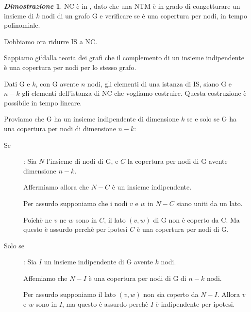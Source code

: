 \documentclass[12pt]{article}
\theoremstyle{definition}
\newtheorem*{myproof}{\em Dimostrazione}
\begin{document}
\begin{myproof}
  NC \`e in \NP, dato che una NTM \`e in grado di congetturare un insieme di \(k\) nodi
  di un grafo G e verificare se \`e una copertura per nodi, in tempo polinomiale.

  Dobbiamo ora ridurre IS a NC.

  Sappiamo gi`\a dalla teoria dei grafi che il complemento di un insieme indipendente \`e una
  copertura per nodi per lo stesso grafo.

  Dati G e \(k\), con G avente \(n\) nodi, gli elementi di una istanza di IS, siano G e \(n-k\) gli elementi dell'istanza di
  NC che vogliamo costruire. Questa costruzione \`e possibile in tempo lineare.

  Proviamo che G ha un insieme indipendente di dimensione \(k\) se e solo se G ha una copertura per nodi di dimensione \(n-k\):

  \begin{description}

  \item[Se]: Sia \(N\) l'insieme di nodi di G, e \(C\) la copertura per nodi di G avente dimensione \(n-k\).\newline

    Affermiamo allora che \(N-C\) \`e un insieme indipendente.\newline

    Per assurdo supponiamo che i nodi \(v\) e \(w\) in \(N-C\) siano uniti da un lato.\newline

    Poich\`e ne \(v\) ne \(w\) sono in \(C\), il lato \((v,w)\) di G non \`e coperto da C.\newline
    Ma questo \`e assurdo perch\`e per ipotesi \(C\) \`e una copertura per nodi di G.\newline

  \item[Solo se]: Sia \(I\) un insieme indipendente di G avente \(k\) nodi.\newline

    Affemiamo che \(N-I\) \`e una copertura per nodi di G di \(n-k\) nodi.\newline

    Per assurdo supponiamo il lato \((v,w)\) non sia coperto da \(N-I\).\newline
    Allora \(v\) e \(w\) sono in \(I\), ma questo \`e assurdo perch\`e \(I\) \`e indipendente per ipotesi.

  \end{description}  

  \hfill \qedsymbol
\end{myproof}
\end{document}
